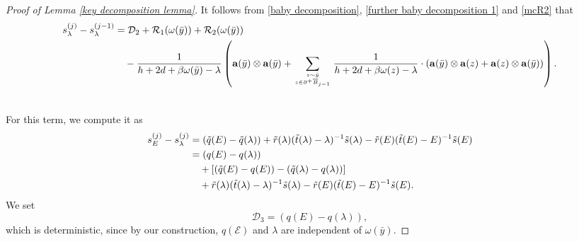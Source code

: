 \documentclass[10pt,a4paper]{amsart}
\newcommand{\barB}{\overline{B}}
\newcommand{\bfa}{\mathbf{a}}
\newcommand{\mcD}{\mathcal{D}}
\newcommand{\mcE}{\mathcal{E}}
\newcommand{\mcR}{\mathcal{R}}
\newcommand{\smallSjminusone}{s^{(j-1)}}
\newcommand{\smallSj}{s^{(j)}}
\newcommand{\tq}{\tilde{q}}
\newcommand{\tr}{\tilde{r}}
\newcommand{\ts}{\tilde{s}}
\renewcommand{\tt}{\tilde{t}}
\begin{document}
\begin{proof}[Proof of Lemma \ref{key decomposition lemma}]
It follows from \eqref{baby decomposition}, \eqref{further baby decomposition 1} and \eqref{mcR2} that
{\small
\begin{align}\label{second term decomposition}
  \smallSj_{\lambda}-\smallSjminusone_\lambda &= \mcD_2 +\mcR_1 (\omega(\bar{y})) +\mcR_2(\omega(\bar{y})) \\
  \notag &\ \ \ -\frac{1}{h+2d+\beta \omega(\bar{y})-\lambda}\left(\bfa(\bar{y})\otimes \bfa(\bar{y})+ \sum_{z\sim \bar{y} \atop z\in \partial^+\barB_{j-1}} \frac{1}{h+2d+\beta\omega(z)-\lambda } \cdot(\bfa(\bar{y}) \otimes  \bfa(z)+\bfa(z)\otimes\bfa(\bar{y})  )\right).
\end{align}
}


\noindent {\Large  {\textbf{(Term $(\smallSj_E-\smallSj_{\lambda})$)}}  }\\

\noindent For this term, we compute it as 
\begin{align}\label{baby decomposition 2}
 \notag \smallSj_E-\smallSj_{\lambda} &=(\tq(E)-\tq(\lambda)) +\tr(\lambda) (\tt(\lambda)-\lambda)^{-1} \ts(\lambda)  -\tr(E) (\tt(E)-E)^{-1} \ts(E) \\
                     & =(q(E)-q(\lambda)) \\
         \notag                      & \ \ \ +[(\tq(E)-q(E))-(\tq(\lambda) -q(\lambda)) ]\\
         \notag                     &\ \ \ +\tr(\lambda) (\tt(\lambda)-\lambda)^{-1} \ts(\lambda)  -\tr(E) (\tt(E)-E)^{-1} \ts(E).  
\end{align}
We set 
\begin{equation}\label{mcD3}
  \mcD_3= (q(E)-q(\lambda)),
\end{equation}
which is deterministic, since by our construction,  $q(\mcE)$ and $\lambda$ are independent of $\omega(\bar{y})$. 


\end{proof}
\end{document}
